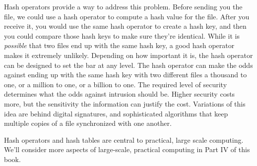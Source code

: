 Hash operators provide a way to address this problem.
Before sending you the file, we could use a hash operator to compute a hash
value for the file. After you receive it, you would use the same hash operator
to create a hash key, and then you could compare those hash keys to make sure
they're identical. While it is \emph{possible} that two files end up with the
same hash key, a good hash operator makes it extremely unlikely.
Depending on how important it is, the hash operator can be designed to set
the bar at any level. The hash operator can make the odds against
ending up with the same hash key with two different files a thousand to one,
or a million to one, or a billion to one. The required level of security
determines what the odds against intrusion should be. Higher security
costs more, but the sensitivity the information can justify the cost.
Variations of this idea are behind digital signatures, and sophisticated
algorithms that keep multiple copies of a file synchronized with one another.

Hash operators and hash tables are central to practical, large scale computing.
We'll consider more aspects of large-scale, practical computing
in Part IV of this book.

